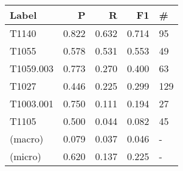 \begin{tabular}{lrrrl}
    \toprule
    Label     & P     & R     & F1    & \#  \\
    \midrule
    T1140     & 0.822 & 0.632 & 0.714 & 95  \\
    T1055     & 0.578 & 0.531 & 0.553 & 49  \\
    T1059.003 & 0.773 & 0.270 & 0.400 & 63  \\
    T1027     & 0.446 & 0.225 & 0.299 & 129 \\
    T1003.001 & 0.750 & 0.111 & 0.194 & 27  \\
    T1105     & 0.500 & 0.044 & 0.082 & 45 \\
    (macro)   & 0.079 & 0.037 & 0.046 & - \\
    (micro)   & 0.620 & 0.137 & 0.225 & -   \\
    \bottomrule
\end{tabular}
